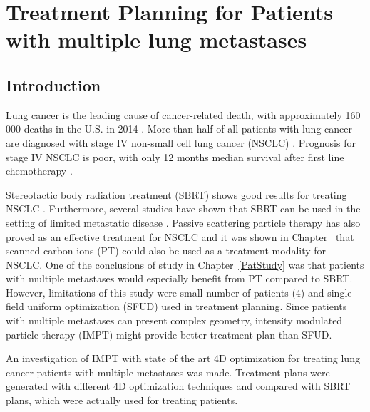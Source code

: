 \documentclass[type=dr, dr=rernat, accentcolor=tud7b,colorbacktitle, bigchapter, openright, twoside, 12pt ]{tudthesis}
\begin{document}
\chapter{Treatment Planning for Patients with multiple lung metastases}
\label{chapter:vmm}
\minitoc

\section{Introduction}

Lung cancer is the leading cause of cancer-related death, with approximately 160 000 deaths in the U.S. in 2014 \cite{Siegel2014}.
More than half of all patients with lung cancer are diagnosed with stage IV non-small cell lung cancer (NSCLC) \cite{Ramalingam2008, Iyengar2014}.
Prognosis for stage IV NSCLC is poor, with only 12 months median survival after first line chemotherapy \cite{Socinski2013}. 

Stereotactic body radiation treatment (SBRT) shows good results for treating NSCLC \cite{Baumann2009, Fakiris2009, Grutters2010, Ricardi2010, Timmerman2010, Greco2011}. 
Furthermore, several studies have shown that SBRT can be used in the setting of limited metastatic 
disease \cite{Rusthoven2009. Villaruz2012, Salama2012, Iyengar2014}. 
Passive scattering particle therapy has also proved as an effective treatment for NSCLC \cite{Grutters2010, Tsujii2012} and it was shown in Chapter~\cite{PatStudy} 
that scanned carbon ions (PT) could also be used as a treatment modality for NSCLC. One of the conclusions of study in Chapter~\ref{PatStudy} 
was that patients with multiple metastases would especially benefit from PT compared to SBRT. However, limitations of this study were small number of patients (4) and single-field uniform optimization (SFUD) used in treatment planning. 
Since patients with multiple metastases can present complex geometry, intensity modulated particle therapy (IMPT) might provide better treatment plan than SFUD.

An investigation of IMPT with state of the art 4D optimization for treating lung cancer patients with multiple metastases was made. Treatment plans were generated with different 4D optimization techniques and compared with
SBRT plans, which were actually used for treating patients.


\end{document}
